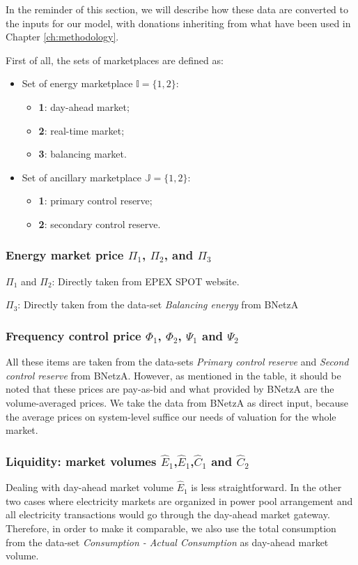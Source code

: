 In the reminder of this section, we will describe how these data are converted to the inputs for our model, with donations inheriting from what have been used in Chapter \ref{ch:methodology}.

First of all, the sets of marketplaces are defined as:

\begin{itemize}
	\item Set of energy marketplace $\mathbb{I} = \{1,2\}$:
	\begin{itemize}
		\item \textbf{1}: day-ahead market;
		\item \textbf{2}: real-time market;
		\item \textbf{3}: balancing market.
	\end{itemize}
	\item Set of ancillary marketplace $\mathbb{J}=\{1,2\}$:
	\begin{itemize}
		\item \textbf{1}: primary control reserve;
		\item \textbf{2}: secondary control reserve.
	\end{itemize}
\end{itemize}

\subsubsection{Energy market price $\Pi_1$, $\Pi_2$, and $\Pi_3$}

$\Pi_1$ and $\Pi_2$: Directly taken from EPEX SPOT website.

$\Pi_3$:
Directly taken from the data-set \textit{Balancing energy} from BNetzA

\subsubsection{Frequency control price $\Phi_1$, $\Phi_2$, $\Psi_1$ and $\Psi_2$}

All these items are taken from the data-sets \textit{Primary control reserve} and \textit{Second control reserve} from BNetzA. However, as mentioned in the table, it should be noted that these prices are pay-as-bid and what provided by BNetzA are the volume-averaged prices. We take the data from BNetzA as direct input, because the average prices on system-level suffice our needs of valuation for the whole market.

\subsubsection{Liquidity: market volumes $\hat{E}_1$,$\hat{E}_1$,$\hat{C}_1$ and $\hat{C}_2$}
Dealing with day-ahead market volume $\hat{E}_1$ is less straightforward. In the other two cases where electricity markets are organized in power pool arrangement and all electricity transactions would go through the day-ahead market gateway. Therefore, in order to make it comparable, we also use the total consumption from the data-set \textit{Consumption - Actual Consumption} as day-ahead market volume.

